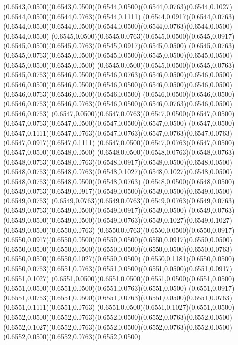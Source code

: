(0.6543,0.0500)(0.6543,0.0500)(0.6544,0.0500)(0.6544,0.0763)(0.6544,0.1027)(0.6544,0.0500)(0.6544,0.0763)(0.6544,0.1111)
(0.6544,0.0917)(0.6544,0.0763)(0.6544,0.0500)(0.6544,0.0500)(0.6544,0.0500)(0.6544,0.0763)(0.6544,0.0500)(0.6544,0.0500)
(0.6545,0.0500)(0.6545,0.0763)(0.6545,0.0500)(0.6545,0.0917)(0.6545,0.0500)(0.6545,0.0763)(0.6545,0.0917)(0.6545,0.0500)
(0.6545,0.0763)(0.6545,0.0763)(0.6545,0.0500)(0.6545,0.0500)(0.6545,0.0500)(0.6545,0.0500)(0.6545,0.0500)(0.6545,0.0500)
(0.6545,0.0500)(0.6545,0.0500)(0.6545,0.0763)(0.6545,0.0763)(0.6546,0.0500)(0.6546,0.0763)(0.6546,0.0500)(0.6546,0.0500)
(0.6546,0.0500)(0.6546,0.0500)(0.6546,0.0500)(0.6546,0.0500)(0.6546,0.0500)(0.6546,0.0763)(0.6546,0.0500)(0.6546,0.0500)
(0.6546,0.0500)(0.6546,0.0500)(0.6546,0.0763)(0.6546,0.0763)(0.6546,0.0500)(0.6546,0.0763)(0.6546,0.0500)(0.6546,0.0763)
(0.6547,0.0500)(0.6547,0.0763)(0.6547,0.0500)(0.6547,0.0500)(0.6547,0.0763)(0.6547,0.0500)(0.6547,0.0500)(0.6547,0.0500)
(0.6547,0.0500)(0.6547,0.1111)(0.6547,0.0763)(0.6547,0.0763)(0.6547,0.0763)(0.6547,0.0763)(0.6547,0.0917)(0.6547,0.1111)
(0.6547,0.0500)(0.6547,0.0763)(0.6547,0.0500)(0.6547,0.0500)(0.6548,0.0500)
\PST@Solid(0.6548,0.0500)(0.6548,0.0763)(0.6548,0.0763)(0.6548,0.0763)(0.6548,0.0763)(0.6548,0.0917)(0.6548,0.0500)(0.6548,0.0500)
(0.6548,0.0763)(0.6548,0.0763)(0.6548,0.1027)(0.6548,0.1027)(0.6548,0.0500)(0.6548,0.0763)(0.6548,0.0500)(0.6548,0.0763)
(0.6548,0.0500)(0.6548,0.0500)(0.6549,0.0763)(0.6549,0.0917)(0.6549,0.0500)(0.6549,0.0500)(0.6549,0.0500)(0.6549,0.0763)
(0.6549,0.0763)(0.6549,0.0763)(0.6549,0.0763)(0.6549,0.0763)(0.6549,0.0763)(0.6549,0.0500)(0.6549,0.0917)(0.6549,0.0500)
(0.6549,0.0763)(0.6549,0.0500)(0.6549,0.0500)(0.6549,0.0763)(0.6549,0.1027)(0.6549,0.1027)(0.6549,0.0500)(0.6550,0.0763)
(0.6550,0.0763)(0.6550,0.0500)(0.6550,0.0917)(0.6550,0.0917)(0.6550,0.0500)(0.6550,0.0500)(0.6550,0.0917)(0.6550,0.0500)
(0.6550,0.0500)(0.6550,0.0500)(0.6550,0.0500)(0.6550,0.0500)(0.6550,0.0763)(0.6550,0.0500)(0.6550,0.1027)(0.6550,0.0500)
(0.6550,0.1181)(0.6550,0.0500)(0.6550,0.0763)(0.6551,0.0763)(0.6551,0.0500)(0.6551,0.0500)(0.6551,0.0917)(0.6551,0.1027)
(0.6551,0.0500)(0.6551,0.0500)(0.6551,0.0500)(0.6551,0.0500)(0.6551,0.0500)(0.6551,0.0500)(0.6551,0.0763)(0.6551,0.0500)
(0.6551,0.0917)(0.6551,0.0763)(0.6551,0.0500)(0.6551,0.0763)(0.6551,0.0500)(0.6551,0.0763)(0.6551,0.1111)(0.6551,0.0763)
(0.6551,0.0500)(0.6551,0.1027)(0.6551,0.0500)(0.6552,0.0500)(0.6552,0.0763)(0.6552,0.0500)(0.6552,0.0763)(0.6552,0.0500)
(0.6552,0.1027)(0.6552,0.0763)(0.6552,0.0500)(0.6552,0.0763)(0.6552,0.0500)(0.6552,0.0500)(0.6552,0.0763)(0.6552,0.0500)
